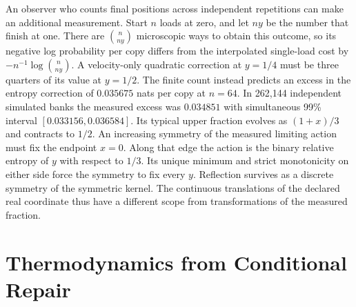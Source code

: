 \documentclass[11pt]{article}
\begin{document}
An observer who counts final positions across independent repetitions
can make an additional measurement. Start $n$ loads at zero, and let
$ny$ be the number that finish at one. There are $\binom{n}{ny}$
microscopic ways to obtain this outcome, so its negative log probability
per copy differs from the interpolated single-load cost by
$-n^{-1}\log\binom{n}{ny}$. A velocity-only quadratic correction at
$y=1/4$ must be three quarters of its value at $y=1/2$.
The finite count instead predicts an excess in the entropy correction of
$0.035675$ nats per copy at $n=64$. In 262,144 independent simulated
banks the measured excess was $0.034851$ with simultaneous 99\% interval
$[0.033156,0.036584]$. Its typical upper fraction evolves as $(1+x)/3$
and contracts to $1/2$. An increasing symmetry of the measured limiting
action must fix the endpoint $x=0$. Along that edge the action is the
binary relative entropy of $y$ with respect to $1/3$. Its unique minimum
and strict monotonicity on either side force the symmetry to fix every
$y$. Reflection survives as a discrete symmetry of the symmetric kernel.
The continuous translations of the declared real coordinate thus have a
different scope from transformations of the measured fraction.

\section{Thermodynamics from Conditional Repair}
\label{sec:thermodynamics}
\end{document}
